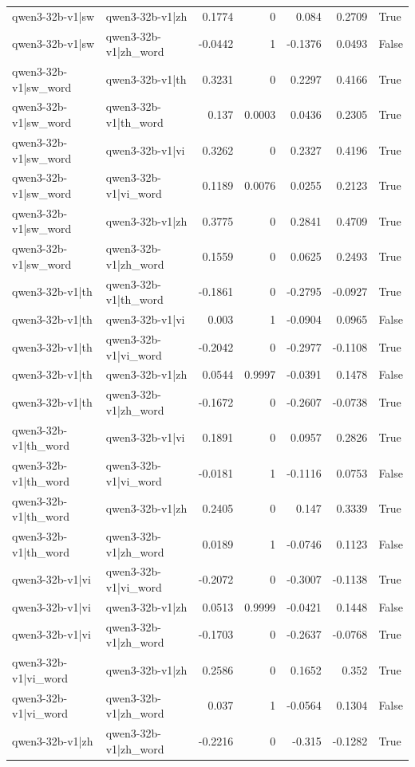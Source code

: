 \begin{table}
\begin{tabular}{l l r r r r l}
qwen3-32b-v1|sw & qwen3-32b-v1|zh & 0.1774 & 0 & 0.084 & 0.2709 & True \\
qwen3-32b-v1|sw & qwen3-32b-v1|zh_word & -0.0442 & 1 & -0.1376 & 0.0493 & False \\
qwen3-32b-v1|sw_word & qwen3-32b-v1|th & 0.3231 & 0 & 0.2297 & 0.4166 & True \\
qwen3-32b-v1|sw_word & qwen3-32b-v1|th_word & 0.137 & 0.0003 & 0.0436 & 0.2305 & True \\
qwen3-32b-v1|sw_word & qwen3-32b-v1|vi & 0.3262 & 0 & 0.2327 & 0.4196 & True \\
qwen3-32b-v1|sw_word & qwen3-32b-v1|vi_word & 0.1189 & 0.0076 & 0.0255 & 0.2123 & True \\
qwen3-32b-v1|sw_word & qwen3-32b-v1|zh & 0.3775 & 0 & 0.2841 & 0.4709 & True \\
qwen3-32b-v1|sw_word & qwen3-32b-v1|zh_word & 0.1559 & 0 & 0.0625 & 0.2493 & True \\
qwen3-32b-v1|th & qwen3-32b-v1|th_word & -0.1861 & 0 & -0.2795 & -0.0927 & True \\
qwen3-32b-v1|th & qwen3-32b-v1|vi & 0.003 & 1 & -0.0904 & 0.0965 & False \\
qwen3-32b-v1|th & qwen3-32b-v1|vi_word & -0.2042 & 0 & -0.2977 & -0.1108 & True \\
qwen3-32b-v1|th & qwen3-32b-v1|zh & 0.0544 & 0.9997 & -0.0391 & 0.1478 & False \\
qwen3-32b-v1|th & qwen3-32b-v1|zh_word & -0.1672 & 0 & -0.2607 & -0.0738 & True \\
qwen3-32b-v1|th_word & qwen3-32b-v1|vi & 0.1891 & 0 & 0.0957 & 0.2826 & True \\
qwen3-32b-v1|th_word & qwen3-32b-v1|vi_word & -0.0181 & 1 & -0.1116 & 0.0753 & False \\
qwen3-32b-v1|th_word & qwen3-32b-v1|zh & 0.2405 & 0 & 0.147 & 0.3339 & True \\
qwen3-32b-v1|th_word & qwen3-32b-v1|zh_word & 0.0189 & 1 & -0.0746 & 0.1123 & False \\
qwen3-32b-v1|vi & qwen3-32b-v1|vi_word & -0.2072 & 0 & -0.3007 & -0.1138 & True \\
qwen3-32b-v1|vi & qwen3-32b-v1|zh & 0.0513 & 0.9999 & -0.0421 & 0.1448 & False \\
qwen3-32b-v1|vi & qwen3-32b-v1|zh_word & -0.1703 & 0 & -0.2637 & -0.0768 & True \\
qwen3-32b-v1|vi_word & qwen3-32b-v1|zh & 0.2586 & 0 & 0.1652 & 0.352 & True \\
qwen3-32b-v1|vi_word & qwen3-32b-v1|zh_word & 0.037 & 1 & -0.0564 & 0.1304 & False \\
qwen3-32b-v1|zh & qwen3-32b-v1|zh_word & -0.2216 & 0 & -0.315 & -0.1282 & True \\
\bottomrule
\end{tabular}
\end{table}
